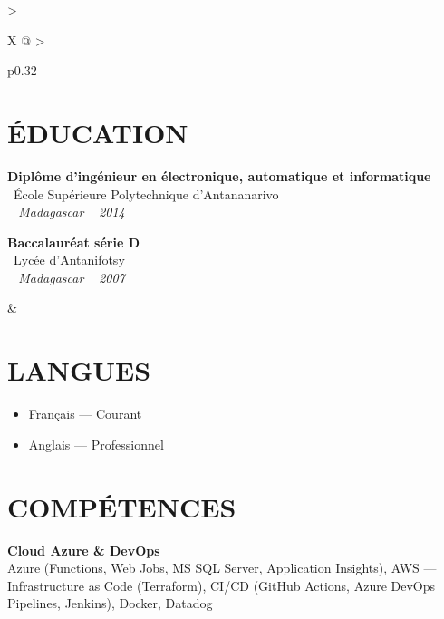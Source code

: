\documentclass[10pt,a4paper]{article}
\begin{document}
\vspace{14pt}

\setlength{\tabcolsep}{0pt}
\begin{tabularx}{\textwidth}{
  >{\raggedright\arraybackslash}X
  @{\hspace{1cm}}
  >{\raggedright\arraybackslash}p{0.32\textwidth}
}
\begin{minipage}[t]{\linewidth}
\section*{ÉDUCATION}

\textbf{Diplôme d'ingénieur en électronique, automatique et informatique}\\
\textcolor{primary}{ \faGraduationCap\ École Supérieure Polytechnique d'Antananarivo}\\
\textit{ \small \textcolor{darkgray}{ \faMapMarker\ } Madagascar } \hfill  \textit{ \small \textcolor{darkgray}{ \faCalendar\ } 2014 }

\vspace{6pt}

\textbf{Baccalauréat série D}\\
\textcolor{primary}{ \faGraduationCap\ Lycée d'Antanifotsy}\\
\textit{ \small \textcolor{darkgray}{ \faMapMarker\ } Madagascar } \hfill  \textit{ \small \textcolor{darkgray}{ \faCalendar\ } 2007 }
\end{minipage}
&
\begin{minipage}[t]{\linewidth}

\section*{LANGUES}

\begin{itemize}
  \item Français --- Courant
  \item Anglais --- Professionnel
\end{itemize}

\section*{COMPÉTENCES}

\textbf{\color{primary} Cloud Azure \& DevOps}\\
\color{darkgray} Azure (Functions, Web Jobs, MS SQL Server, Application Insights), AWS --- Infrastructure as Code (Terraform), CI/CD (GitHub Actions, Azure DevOps Pipelines, Jenkins), Docker, Datadog


\end{minipage}
\end{tabularx}
\end{document}
